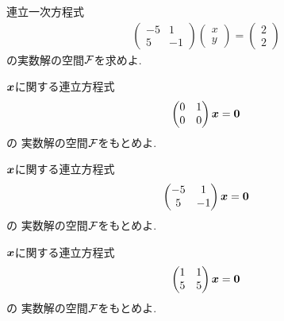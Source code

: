 \begin{quiz}
  \label{quiz:3:3x}

  連立一次方程式
  \begin{align*}
    \begin{pmatrix}-5&1\\5&-1\end{pmatrix}
    \begin{pmatrix}x\\y\end{pmatrix}
      =
      \begin{pmatrix}2\\2\end{pmatrix}
  \end{align*}
  の実数解の空間$\mathcal{F}$を求めよ.
\end{quiz}


\begin{quiz}
  \label{quiz:3:8}
  $\boldsymbol{x}$に関する連立方程式
  \begin{align*}
    \begin{pmatrix}0&1\\0&0\end{pmatrix}
      \boldsymbol{x}
      =\boldsymbol{0}
  \end{align*}
  の
  実数解の空間$\mathcal{F}$をもとめよ.
\end{quiz}

\begin{quiz}
  \label{quiz:3:9}
  $\boldsymbol{x}$に関する連立方程式
  \begin{align*}
    \begin{pmatrix}-5&1\\5&-1\end{pmatrix}
      \boldsymbol{x}
      =\boldsymbol{0}
  \end{align*}
  の
  実数解の空間$\mathcal{F}$をもとめよ.
\end{quiz}

\begin{quiz}
  \label{quiz:3:10}
  $\boldsymbol{x}$に関する連立方程式
  \begin{align*}
    \begin{pmatrix}1&1\\5&5\end{pmatrix}
      \boldsymbol{x}
      =\boldsymbol{0}
  \end{align*}
  の
  実数解の空間$\mathcal{F}$をもとめよ.
\end{quiz}



